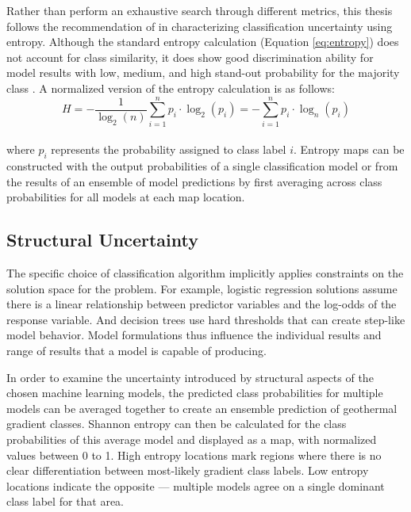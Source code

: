 Rather than perform an exhaustive search through different metrics, this thesis follows the recommendation of \citep{beaudette_accuracy_2020} in characterizing classification uncertainty using entropy. Although the standard entropy calculation (Equation \ref{eq:entropy}) does not account for class similarity, it does show good discrimination ability for model results with low, medium, and high stand-out probability for the majority class \citep{beaudette_accuracy_2020}. A normalized version of the entropy calculation is as follows:
\begin{equation}
\label{eq:norm_entropy}
    H = -\frac{1}{\log_2{(n)}}\sum_{i=1}^{n}{p_i \cdot \log_2{(p_i)}} = -\sum_{i=1}^{n}{p_i \cdot \log_n{(p_i)}}
\end{equation}
\\
where $p_i$ represents the probability assigned to class label $i$. Entropy maps can be constructed with the output probabilities of a single classification model or from the results of an ensemble of model predictions by first averaging across class probabilities for all models at each map location.

\subsection{Structural Uncertainty}\label{ch3:structural_uncertainty}
The specific choice of classification algorithm implicitly applies constraints on the solution space for the problem. For example, logistic regression solutions assume there is a linear relationship between predictor variables and the log-odds of the response variable. And decision trees use hard thresholds that can create step-like model behavior. Model formulations thus influence the individual results and range of results that a model is capable of producing.

In order to examine the uncertainty introduced by structural aspects of the chosen machine learning models, the predicted class probabilities for multiple models can be averaged together to create an ensemble prediction of geothermal gradient classes. Shannon entropy can then be calculated for the class probabilities of this average model and displayed as a map, with normalized values between 0 to 1. High entropy locations mark regions where there is no clear differentiation between most-likely gradient class labels. Low entropy locations indicate the opposite --- multiple models agree on a single dominant class label for that area.

